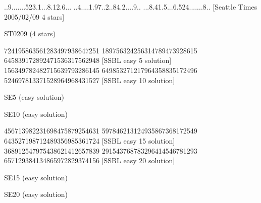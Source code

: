 \documentclass[twoside]{article}
\begin{document}
\renewcommand*{\puzzlefile}{st0209.sud}
\writepuzzle%
{..9......}{.523.1...}{8.12.6...}%
{..4....1.}{97..2..84}{.2....9..}%
{...8.41.5}{...6.524.}{......8..}%
[Seattle Times 2005/02/09 4 stars]
\vfill
\begin{minipage}{0.95\linewidth}\begin{center}
ST0209 (4 stars) \\
\end{center}\end{minipage}


\clearpage
\pagestyle{empty}
\cleardoublepage
\pagestyle{myheadings}

\cluefont{\normalsize}

\renewcommand*{\puzzlefile}{se5.ans}
\writepuzzle%
{724195863}{561283497}{938647251}%
{189756324}{256314789}{473928615}%
{645839172}{892471536}{317562948}%
[SSBL easy 5 solution]
\renewcommand*{\puzzlefile}{se10.ans}
\writepuzzle%
{156349782}{482715639}{793286145}%
{649853271}{217964358}{835172496}%
{524697813}{371528964}{968431527}%
[SSBL easy 10 solution]
\vfill
\noindent\begin{minipage}{0.47\linewidth}\begin{center}
SE5 (easy solution) \\
\end{center}\end{minipage}
\hfill
\begin{minipage}{0.47\linewidth}\begin{center}
SE10 (easy solution) \\
\end{center}\end{minipage}

\renewcommand*{\puzzlefile}{se15.ans}
\writepuzzle%
{456713982}{231698475}{879254631}%
{597846213}{124935867}{368172549}%
{643527198}{712489356}{985361724}%
[SSBL easy 15 solution]
\renewcommand*{\puzzlefile}{se20.ans}
\writepuzzle%
{368912547}{975438621}{412657839}%
{291543768}{783296414}{546781293}%
{657129384}{134865972}{829374156}%
[SSBL easy 20 solution]
\vfill
\noindent\begin{minipage}{0.47\linewidth}\begin{center}
SE15 (easy solution) \\
\end{center}\end{minipage}
\hfill
\begin{minipage}{0.47\linewidth}\begin{center}
SE20 (easy solution) \\
\end{center}\end{minipage}
\end{document}
